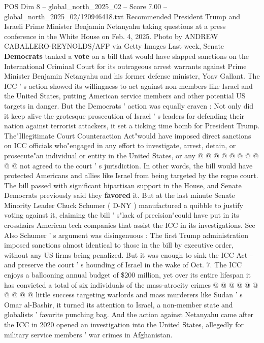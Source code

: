 \begin{textsample}{POS Dim 8 – global\_north\_2025\_02 – Score 7.00 – global\_north\_2025\_02/120946418.txt}  \label{ex:f8_pos_314}
Recommended President Trump and Israeli Prime Minister Benjamin Netanyahu taking questions at a press conference in the White House on Feb. 4, 2025.
Photo by ANDREW CABALLERO-REYNOLDS/AFP via Getty Images Last week, Senate \textbf{Democrats} tanked a \textbf{vote} on a bill that would have slapped sanctions on the International Criminal Court for its outrageous arrest warrants against Prime Minister Benjamin Netanyahu and his former defense minister, Yoav Gallant.
The ICC ' s action showed its willingness to act against non-members like Israel and the United States, putting American service members and other potential US targets in danger.
But the Democrats ' action was equally craven : Not only did it keep alive the grotesque prosecution of Israel ' s leaders for defending their nation against terrorist attackers, it set a ticking time bomb for President Trump.
The"Illegitimate Court Counteraction Act"would have imposed direct sanctions on ICC officials who"engaged in any effort to investigate, arrest, detain, or prosecute"an individual or entity in the United States, or any @ @ @ @ @ @ @ @ @ @ not agreed to the court ' s jurisdiction.
In other words, the bill would have protected Americans and allies like Israel from being targeted by the rogue court.
The bill passed with significant bipartisan support in the House, and Senate Democrats previously said they \textbf{favored} it.
But at the last minute Senate Minority Leader Chuck Schumer ( D-NY ) manufactured a quibble to justify voting against it, claiming the bill ' s"lack of precision"could have put in its crosshairs American tech companies that assist the ICC in its investigations.
See Also Schumer ' s argument was disingenuous : The first Trump administration imposed sanctions almost identical to those in the bill by executive order, without any US firms being penalized.
But it was enough to sink the ICC Act -- and preserve the court ' s hounding of Israel in the wake of Oct. 7.
The ICC enjoys a ballooning annual budget of \$200 million, yet over its entire lifespan it has convicted a total of six individuals of the mass-atrocity crimes @ @ @ @ @ @ @ @ @ @ little success targeting warlords and mass murderers like Sudan ' s Omar al-Bashir, it turned its attention to Israel, a non-member state and globalists ' favorite punching bag.
And the action against Netanyahu came after the ICC in 2020 opened an investigation into the United States, allegedly for military service members ' war crimes in Afghanistan.

\end{textsample}

